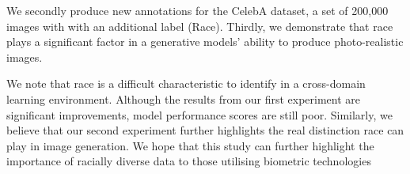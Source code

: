 \documentclass[10pt,twocolumn,letterpaper]{article}
\begin{document}
We secondly produce new annotations for the CelebA dataset, a set of 200,000 images with with an additional label (Race). Thirdly, we demonstrate that race plays a significant factor in a generative models' ability to produce photo-realistic images.

We note that race is a difficult characteristic to identify in a cross-domain learning environment. Although the results from our first experiment are significant improvements, model performance scores are still poor. Similarly, we believe that our second experiment further highlights the real distinction race can play in image generation. We hope that this study can further highlight the importance of racially diverse data to those utilising biometric technologies

{\small


}
\end{document}
